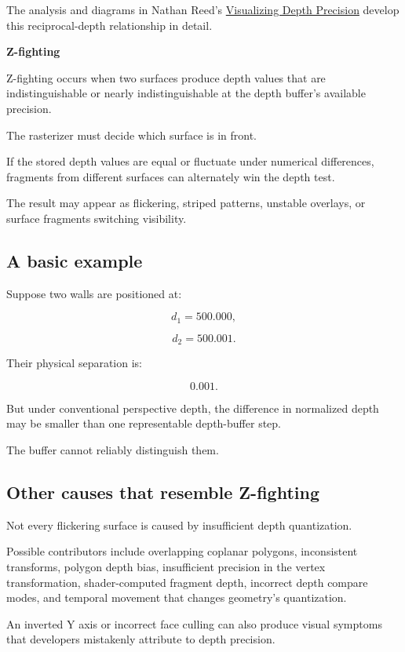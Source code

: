 The analysis and diagrams in Nathan Reed's \href{https://developer.nvidia.com/blog/visualizing-depth-precision/?utm_source=chatgpt.com}{Visualizing Depth Precision} develop this reciprocal-depth relationship in detail. 

\textbf{Z-fighting}

Z-fighting occurs when two surfaces produce depth values that are indistinguishable or nearly indistinguishable at the depth buffer's available precision.

The rasterizer must decide which surface is in front.

If the stored depth values are equal or fluctuate under numerical differences, fragments from different surfaces can alternately win the depth test.

The result may appear as flickering, striped patterns, unstable overlays, or surface fragments switching visibility.

\subsection{A basic example}\label{02-foundations-ii-ch033-a-basic-example}

Suppose two walls are positioned at:

\[
 d_1=500.000,
\]

\[
 d_2=500.001.
\]

Their physical separation is:

\[
 0.001.
\]

But under conventional perspective depth, the difference in normalized depth may be smaller than one representable depth-buffer step.

The buffer cannot reliably distinguish them.

\subsection{Other causes that resemble Z-fighting}\label{02-foundations-ii-ch033-other-causes-that-resemble-z-fighting}

Not every flickering surface is caused by insufficient depth quantization.

Possible contributors include overlapping coplanar polygons, inconsistent transforms, polygon depth bias, insufficient precision in the vertex transformation, shader-computed fragment depth, incorrect depth compare modes, and temporal movement that changes geometry's quantization.

An inverted Y axis or incorrect face culling can also produce visual symptoms that developers mistakenly attribute to depth precision.


